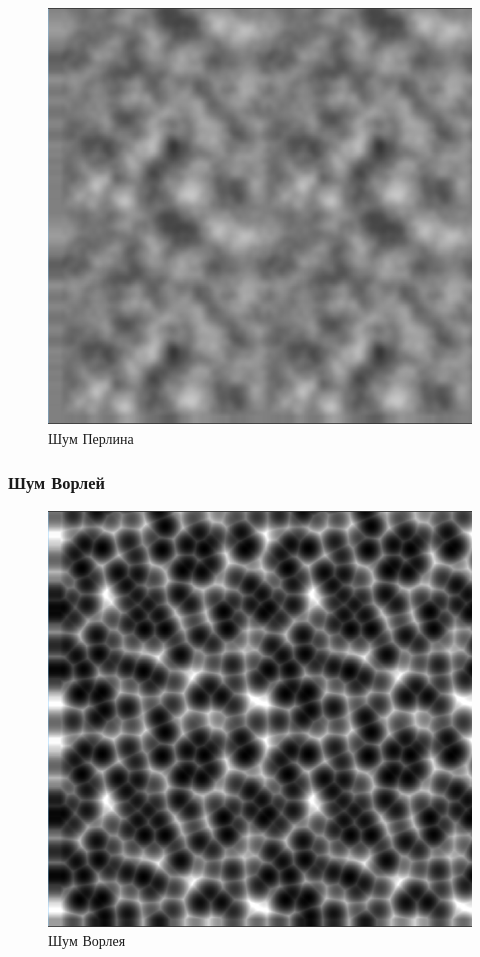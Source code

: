 \begin{figure}[H]
    \centering
    \includegraphics[scale=0.4]{img/perlin.png}
    \caption{Шум Перлина}
    \label{img:perlin}
\end{figure}

\subsubsection{Шум Ворлей}

\begin{figure}[H]
    \centering
    \includegraphics[scale=0.4]{img/worley.png}
    \caption{Шум Ворлея}
    \label{img:perlin}
\end{figure}


